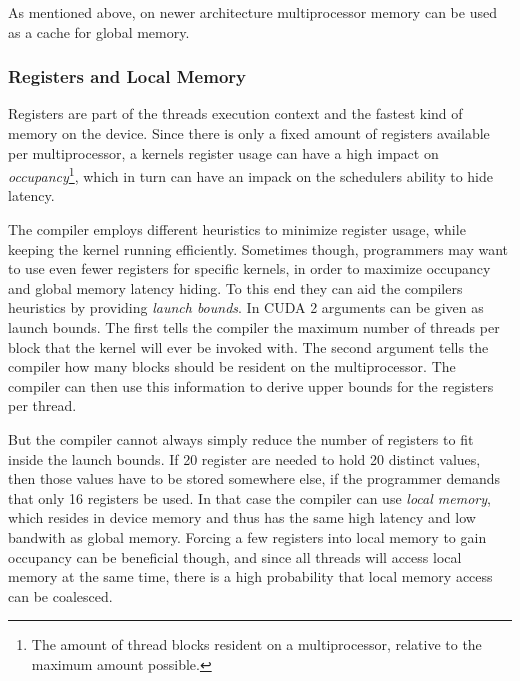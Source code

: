 
As mentioned above, on newer architecture multiprocessor memory can be
used as a cache for global memory.




\subsubsection{Registers and Local Memory}


Registers are part of the threads execution context and the fastest
kind of memory on the device. Since there is only a fixed amount of
registers available per multiprocessor, a kernels register usage can
have a high impact on \textit{occupancy}\footnote{The amount of thread
  blocks resident on a multiprocessor, relative to the maximum amount
  possible.}, which in turn can have an impack on the schedulers
ability to hide latency.


The compiler employs different heuristics to minimize register usage,
while keeping the kernel running efficiently. Sometimes though,
programmers may want to use even fewer registers for specific kernels,
in order to maximize occupancy and global memory latency hiding. To
this end they can aid the compilers heuristics by providing
\textit{launch bounds}. In CUDA 2 arguments can be given as launch
bounds. The first tells the compiler the maximum number of threads per
block that the kernel will ever be invoked with. The second argument
tells the compiler how many blocks should be resident on the
multiprocessor. The compiler can then use this information to derive
upper bounds for the registers per thread.





But the compiler cannot always simply reduce the number of registers
to fit inside the launch bounds. If 20 register are needed to hold 20
distinct values, then those values have to be stored somewhere else,
if the programmer demands that only 16 registers be used. In that case
the compiler can use \textit{local memory}, which resides in device
memory and thus has the same high latency and low bandwith as global
memory. Forcing a few registers into local memory to gain occupancy
can be beneficial though, and since all threads will access local
memory at the same time, there is a high probability that local memory
access can be coalesced.

